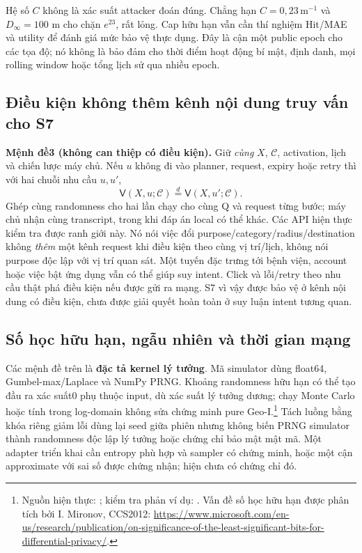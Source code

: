 Hệ số $C$ không là xác suất attacker đoán đúng. Chẳng hạn $C=0{,}23\,\mathrm m^{-1}$ và $D_\infty=100$ m cho chặn $e^{23}$, rất lỏng. Cap hữu hạn vẫn cần thí nghiệm Hit/MAE và utility để đánh giá mức bảo vệ thực dụng. Đây là cận một public epoch cho các tọa độ; nó không là bảo đảm cho thời điểm hoạt động bí mật, định danh, mọi rolling window hoặc tổng lịch sử qua nhiều epoch.

\subsection{Điều kiện không thêm kênh nội dung truy vấn cho S7}

\noindent\textbf{Mệnh đề3 (không can thiệp có điều kiện).} Giữ \emph{cùng} $X$, $\mathcal C$, activation, lịch và chiến lược máy chủ. Nếu $u$ không đi vào planner, request, expiry hoặc retry thì với hai chuỗi nhu cầu $u,u'$,
\begin{equation}
 \mathsf V(X,u;\mathcal C)\overset{d}{=}\mathsf V(X,u';\mathcal C).
 \label{eq:current-purpose-noninterference}
\end{equation}
Ghép cùng randomness cho hai lần chạy cho cùng Q và request từng bước; máy chủ nhận cùng transcript, trong khi đáp án local có thể khác. Các API hiện thực kiểm tra được ranh giới này. Nó nói việc đổi purpose/category/radius/destination không \emph{thêm} một kênh request khi điều kiện theo cùng vị trí/lịch, không nói purpose độc lập với vị trí quan sát. Một tuyến đặc trưng tới bệnh viện, account hoặc việc bật ứng dụng vẫn có thể giúp suy intent. Click và lỗi/retry theo nhu cầu thật phá điều kiện nếu được gửi ra mạng. S7 vì vậy được bảo vệ ở kênh nội dung có điều kiện, chưa được giải quyết hoàn toàn ở suy luận intent tương quan.

\subsection{Số học hữu hạn, ngẫu nhiên và thời gian mạng}

Các mệnh đề trên là \textbf{đặc tả kernel lý tưởng}. Mã simulator dùng float64, Gumbel-max/Laplace và NumPy PRNG. Khoảng randomness hữu hạn có thể tạo đầu ra xác suất0 phụ thuộc input, dù xác suất lý tưởng dương; chạy Monte Carlo hoặc tính trong log-domain không sửa chứng minh pure Geo-I.\footnote{Nguồn hiện thực: ; kiểm tra phản ví dụ: . Vấn đề số học hữu hạn được phân tích bởi I. Mironov, CCS2012: \url{https://www.microsoft.com/en-us/research/publication/on-significance-of-the-least-significant-bits-for-differential-privacy/}.} Tách luồng bằng khóa riêng giảm lỗi dùng lại seed giữa phiên nhưng không biến PRNG simulator thành randomness độc lập lý tưởng hoặc chứng chỉ bảo mật mật mã. Một adapter triển khai cần entropy phù hợp và sampler có chứng minh, hoặc một cận approximate với sai số được chứng nhận; hiện chưa có chứng chỉ đó.

